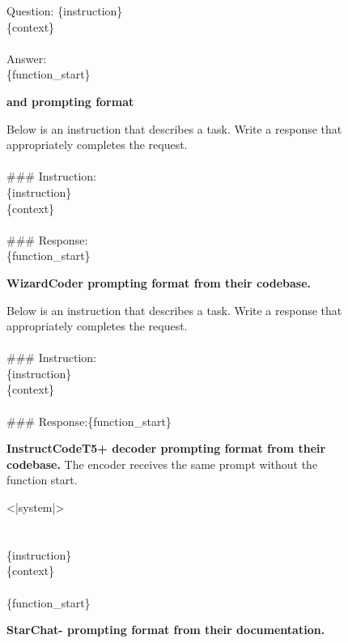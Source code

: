 \begin{figure}[htbp]
\hrulefill

Question: \{instruction\}\\\{context\}\\\\Answer:\\\{function\_start\}

\hrulefill
\caption[]{\textbf{\model{} and \modelx{} prompting format}}
\label{fig:octocoder}
\end{figure}


\begin{figure}[htbp]
\hrulefill

Below is an instruction that describes a task. Write a response that appropriately completes the request.\\\\\#\#\# Instruction:\\\{instruction\}\\\{context\}\\\\\#\#\# Response:\\\{function\_start\}

\hrulefill
\caption[]{\textbf{WizardCoder prompting format from their codebase.\footnotemark}}
\label{fig:wizardcoder}
\end{figure}


\begin{figure}[htbp]
\hrulefill

Below is an instruction that describes a task. Write a response that appropriately completes the request.\\\\\#\#\# Instruction:\\\{instruction\}\\\{context\}\\\\\#\#\# Response:\{function\_start\}

\hrulefill
\caption[]{\textbf{InstructCodeT5+ decoder prompting format from their codebase.\footnotemark} The encoder receives the same prompt without the function start.}
\label{fig:instructcodet5p}
\end{figure}


\begin{figure}[htbp]
\hrulefill

<|system|>\\<|end|>\\<|user|>\\\{instruction\}\\\{context\}<|end|>\\<|assistant|>\\\{function\_start\}

\hrulefill
\caption[]{\textbf{StarChat- prompting format from their documentation.\footnotemark}}
\label{fig:starchatbeta}
\end{figure}

